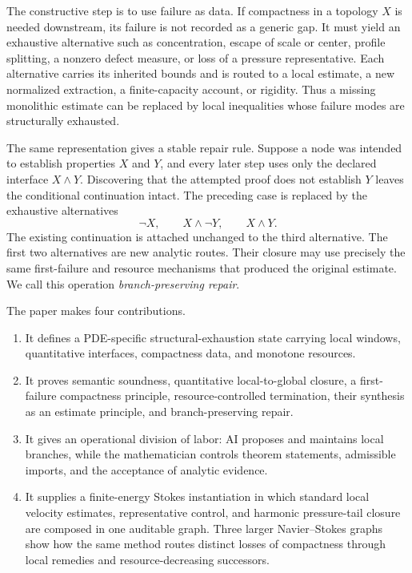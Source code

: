 \documentclass[11pt,reqno]{amsart}
\theoremstyle{plain}
\theoremstyle{definition}
\theoremstyle{remark}
\numberwithin{equation}{section}
\begin{document}
The constructive step is to use failure as data.  If compactness in a topology
\(X\) is needed downstream, its failure is not recorded as a generic gap.  It
must yield an exhaustive alternative such as concentration, escape of scale or
center, profile splitting, a nonzero defect measure, or loss of a pressure
representative.  Each alternative carries its inherited bounds and is routed
to a local estimate, a new normalized extraction, a finite-capacity account,
or rigidity.  Thus a missing monolithic estimate can be replaced by local
inequalities whose failure modes are structurally exhausted.

The same representation gives a stable repair rule.  Suppose a node was
intended to establish properties \(X\) and \(Y\), and every later step uses only
the declared interface \(X\wedge Y\).  Discovering that the attempted proof
does not establish \(Y\) leaves the conditional continuation intact.  The
preceding case is replaced by the exhaustive alternatives
\[
  \neg X,\qquad X\wedge\neg Y,\qquad X\wedge Y.
\]
The existing continuation is attached unchanged to the third alternative.
The first two alternatives are new analytic routes.  Their closure may use
precisely the same first-failure and resource mechanisms that produced the
original estimate.  We call this operation \emph{branch-preserving repair}.

The paper makes four contributions.

\begin{enumerate}
  \item It defines a PDE-specific structural-exhaustion state carrying local
  windows, quantitative interfaces, compactness data, and monotone resources.
  \item It proves semantic soundness, quantitative local-to-global closure, a
  first-failure compactness principle, resource-controlled termination, their
  synthesis as an estimate principle, and branch-preserving repair.
  \item It gives an operational division of labor: AI proposes and maintains
  local branches, while the mathematician controls theorem statements,
  admissible imports, and the acceptance of analytic evidence.
  \item It supplies a finite-energy Stokes instantiation in which standard local
  velocity estimates, representative control, and harmonic pressure-tail closure
  are composed in one auditable graph.  Three larger Navier--Stokes graphs
  show how the same method routes distinct losses of compactness through local
  remedies and resource-decreasing successors.
\end{enumerate}
\end{document}
